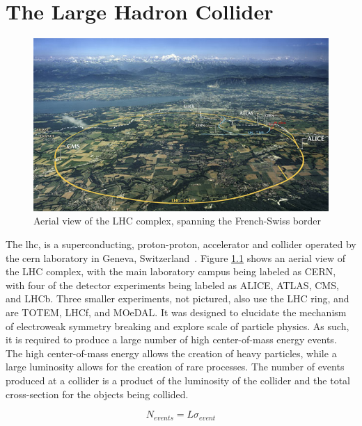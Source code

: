 \chapter{The Large Hadron Collider}
\label{lhc_overview}

\begin{figure}[h]
   \centering
  \includegraphics[width=1.0\textwidth]{Figures/LHC_Diagrams/LHC_Aerial_View.jpg}
  \caption{Aerial view of the LHC complex, spanning the French-Swiss border~\cite{LHC:Aerial_View}} \label{fig:lhc_aerial_with_labels}
\end{figure}

\par The \acrfull{lhc}, is a superconducting, proton-proton,
accelerator and collider operated by the \acrfull{cern} laboratory in
Geneva, Switzerland~\cite{lhc:machine_description}.  Figure
\ref{fig:lhc_aerial_with_labels} shows an aerial view of the LHC
complex, with the main laboratory campus being labeled as CERN, with
four of the detector experiments being labeled as ALICE, ATLAS, CMS,
and LHCb.  Three smaller experiments, not pictured, also use the LHC
ring, and are TOTEM, LHCf, and MOeDAL.  It was designed to elucidate
the mechanism of electroweak symmetry breaking and explore \TeV scale
of particle physics.  As such, it is required to produce a large
number of high center-of-mass energy events.  The high center-of-mass
energy allows the creation of heavy particles, while a large
luminosity allows for the creation of rare processes.  The number of events
produced at a collider is a product of the luminosity of the collider
and the total cross-section for the objects being collided.  

\begin{equation}\label{eq:Nevents}
N_{events} = L\sigma_{event}
\end{equation}

